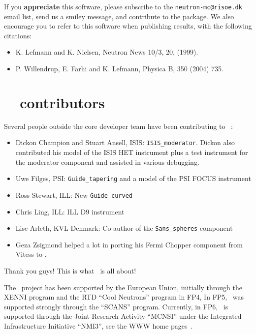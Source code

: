 If you {\bf appreciate} this software, please subscribe to the \verb+neutron-mc@risoe.dk+ email list, send us a smiley message, and contribute to the package. We also encourage you to refer to this software when publishing results, with the following citations:
\begin{itemize}
\item{K. Lefmann and K. Nielsen, Neutron News 10/3, 20, (1999).}
\item{P. Willendrup, E. Farhi and K. Lefmann, Physica B, 350 (2004) 735.}
\end{itemize}


\section*{\MCS\ \version\ contributors}
Several people outside the core developer team have been contributing
to \MCS\ \version:
\begin{itemize}
\item{Dickon Champion and Stuart Ansell, ISIS:
    \verb+ISIS_moderator+. Dickon also contributed his model of the
    ISIS HET instrument plus a test instrument for the moderator
    component and assisted in various debugging.}
\item{Uwe Filges, PSI: \verb+Guide_tapering+ and a model of the PSI
    FOCUS instrument}
\item{Ross Stewart, ILL: New \verb+Guide_curved+}
\item{Chris Ling, ILL: ILL D9 instrument}
\item{Lise Arleth, KVL Denmark: Co-author of the \verb+Sans_spheres+ component}
\item{Geza Zsigmond helped a lot in porting his Fermi Chopper component from Vitess \cite{Vitess, vitess_webpage} to \MCS .}
\end{itemize}
Thank you guys! This is what \MCS\ is all about!

The \MCS\ project has been supported by the European Union, initially
through the XENNI program and the RTD ``Cool Neutrons'' program in FP4,
In FP5, \MCS\ was supported strongly through the
``SCANS'' program.
Currently, in FP6, \MCS\ is supported through the Joint Research Activity
``MCNSI'' under the Integrated Infrastructure Initiative ``NMI3'', see
the WWW home pages~\cite{mcnsi_webpage,nmi3_webpage}.
